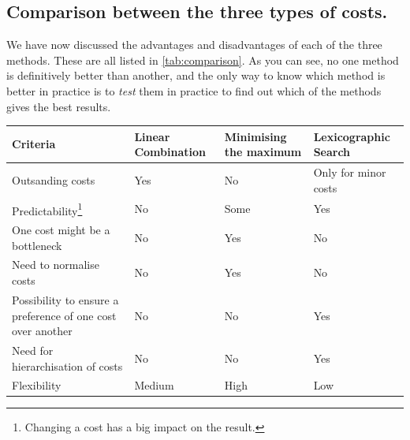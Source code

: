 \subsection{Comparison between the three types of costs.}

We have now discussed the advantages and disadvantages of each of the three methods. These are all listed in \ref{tab:comparison}. As you can see, no one method is definitively better than another, and the only way to know which method is better in practice is to \textit{test} them in practice to find out which of the methods gives the best results. 

\begin{center}
    \centering
    \label{tab:comparison}
    \begin{tabularx}{\textwidth}{|>{\centering\arraybackslash}p{4cm}|>{\centering\arraybackslash}X|>{\centering\arraybackslash}X|>{\centering\arraybackslash}X|}
        \hline
        \textbf{Criteria} & \textbf{Linear Combination} & \textbf{Minimising the maximum} & \textbf{Lexicographic Search} \\
        \hline
        Outsanding costs & \cellcolor{red!25}Yes & \cellcolor{green!25}No & \cellcolor{orange!25}Only for minor costs \\
        \hline
        Predictability\footnote{Changing a cost has a big impact on the result.} & \cellcolor{red!25}No & \cellcolor{orange!25}Some & \cellcolor{green!25}Yes \\
        \hline
        One cost might be a bottleneck & \cellcolor{green!25}No & \cellcolor{red!25}Yes & \cellcolor{green!25}No \\
        \hline
        Need to normalise costs& \cellcolor{green!25}No & \cellcolor{red!25}Yes & \cellcolor{green!25}No \\
        \hline
        Possibility to ensure a preference of one cost over another  & \cellcolor{red!25}No & \cellcolor{red!25}No & \cellcolor{green!25}Yes \\
        \hline
        Need for hierarchisation of costs & \cellcolor{green!25}No & \cellcolor{green!25}No & \cellcolor{red!25}Yes \\
        \hline
        Flexibility & \cellcolor{orange!25}Medium & \cellcolor{green!25}High & \cellcolor{red!25}Low \\
        \hline

    \end{tabularx}
\end{center}

